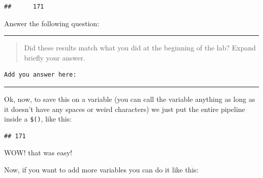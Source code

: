 \documentclass[
]{book}
\newenvironment{Shaded}{\begin{snugshade}}{\end{snugshade}}
\newcommand{\AttributeTok}[1]{\textcolor[rgb]{0.77,0.63,0.00}{#1}}
\newcommand{\BuiltInTok}[1]{#1}
\newcommand{\FunctionTok}[1]{\textcolor[rgb]{0.00,0.00,0.00}{#1}}
\newcommand{\KeywordTok}[1]{\textcolor[rgb]{0.13,0.29,0.53}{\textbf{#1}}}
\newcommand{\NormalTok}[1]{#1}
\newcommand{\OperatorTok}[1]{\textcolor[rgb]{0.81,0.36,0.00}{\textbf{#1}}}
\newcommand{\StringTok}[1]{\textcolor[rgb]{0.31,0.60,0.02}{#1}}
\newcommand{\VariableTok}[1]{\textcolor[rgb]{0.00,0.00,0.00}{#1}}
\begin{document}
\begin{verbatim}
##      171
\end{verbatim}

Answer the following question:

\begin{center}\rule{0.5\linewidth}{0.5pt}\end{center}

\begin{quote}
Did these results match what you did at the beginning of the lab? Expand briefly your answer.
\end{quote}

\begin{verbatim}
Add you answer here:

\end{verbatim}

\begin{center}\rule{0.5\linewidth}{0.5pt}\end{center}

Ok, now, to save this on a variable (you can call the variable anything as long as it doesn't have any spaces or weird characters) we just put the entire pipeline inside a \texttt{\$()}, like this:

\begin{Shaded}
\end{Shaded}

\begin{verbatim}
## 171
\end{verbatim}

WOW! that was easy!

Now, if you want to add more variables you can do it like this:

\begin{Shaded}
\end{Shaded}
\end{document}
